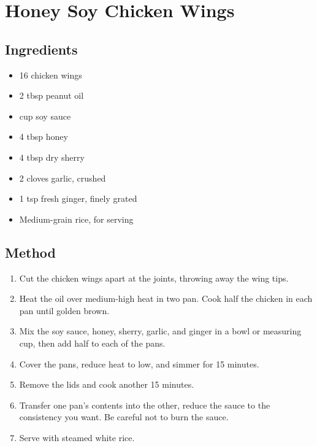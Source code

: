 \clearpage
\section{Honey Soy Chicken Wings}


\subsection{Ingredients}

\begin{itemize}
    \item 16 chicken wings
    \item 2 tbsp peanut oil
    \item {} cup soy sauce
    \item 4 tbsp honey
    \item 4 tbsp dry sherry
    \item 2 cloves garlic, crushed
    \item 1 tsp fresh ginger, finely grated
    \item Medium-grain rice, for serving
\end{itemize}

\subsection{Method}

\begin{enumerate}
    \item Cut the chicken wings apart at the joints, throwing away the wing tips.
    \item Heat the oil over medium-high heat in two pan. Cook half the chicken in each pan until golden brown.
    \item Mix the soy sauce, honey, sherry, garlic, and ginger in a bowl or measuring cup, then add half to each of the pans.
    \item Cover the pans, reduce heat to low, and simmer for 15 minutes.
    \item Remove the lids and cook another 15 minutes.
    \item Transfer one pan's contents into the other, reduce the sauce to the consistency you want. Be careful not to burn the sauce.
    \item Serve with steamed white rice.
\end{enumerate}
